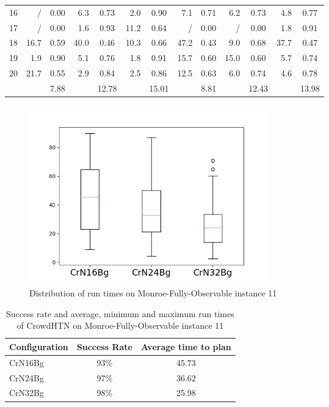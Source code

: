 \begin{table}[!hbp]
\begin{tabular}{|l|rc|rc|rc|rc|rc|rc|}
		16 & / & 0.00 & 6.3 & 0.73 & 2.0 & 0.90 & 7.1 & 0.71 & 6.2 & 0.73 & 4.8 & 0.77\\
		17 & / & 0.00 & 1.6 & 0.93 & 11.2 & 0.64 & / & 0.00 & / & 0.00 & 1.8 & 0.91\\
		18 & 16.7 & 0.59 & 40.0 & 0.46 & 10.3 & 0.66 & 47.2 & 0.43 & 9.0 & 0.68 & 37.7 & 0.47\\
		19 & 1.9 & 0.90 & 5.1 & 0.76 & 1.8 & 0.91 & 15.7 & 0.60 & 15.0 & 0.60 & 5.7 & 0.74\\
		20 & 21.7 & 0.55 & 2.9 & 0.84 & 2.5 & 0.86 & 12.5 & 0.63 & 6.0 & 0.74 & 4.6 & 0.78\\
		\hline
		& & 7.88 & & 12.78 & & 15.01 & & 8.81 & & 12.43 & & 13.98\\
		\hline
	\end{tabular}
\end{table}
\begin{figure}[!hbp]
	\caption{Distribution of run times on Monroe-Fully-Observable instance 11}
	\label{figure: eval scalability box}
	\centering
	\includegraphics[width=0.5\textwidth]{images/final/scalability_2}
\end{figure}
\begin{table}[!hbp]
	\caption{Success rate and average, minimum and maximum run times of CrowdHTN on Monroe-Fully-Observable instance 11}
	\label{table: eval scalability 2}
	\centering
	\begin{tabular}{|l|c|c|}
		\hline
		Configuration & Success Rate & Average time to plan \\
		\hline
		CrN16Bg 	& 93\% & 45.73  \\
		CrN24Bg		& 97\% & 36.62  \\
		CrN32Bg		& 98\% & 25.98  \\
		\hline
	\end{tabular}
\end{table}

